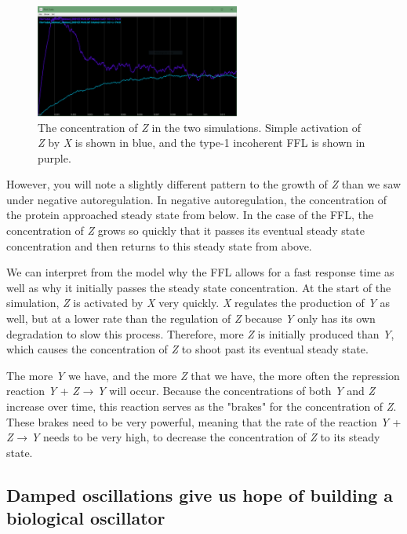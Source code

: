 \begin{figure}[h]
\centering
\mySfFamily
\includegraphics[width = 0.6\textwidth]{../assets/images/600px/ffl_chart.png}
\caption{The concentration of \textit{Z} in the two simulations. Simple activation of \textit{Z} by \textit{X} is shown in blue, and the type-1 incoherent FFL is shown in purple.}
\label{fig:ffl_chart}
\end{figure}

However, you will note a slightly different pattern to the growth of \textit{Z} than we saw under negative autoregulation. In negative autoregulation, the concentration of the protein approached steady state from below. In the case of the FFL, the concentration of \textit{Z} grows so quickly that it passes its eventual steady state concentration and then returns to this steady state from above.

We can interpret from the model why the FFL allows for a fast response time as well as why it initially passes the steady state concentration. At the start of the simulation, \textit{Z} is activated by \textit{X} very quickly. \textit{X} regulates the production of \textit{Y} as well, but at a lower rate than the regulation of \textit{Z} because \textit{Y} only has its own degradation to slow this process. Therefore, more \textit{Z} is initially produced than \textit{Y}, which causes the concentration of \textit{Z} to shoot past its eventual steady state.

The more \textit{Y} we have, and the more \textit{Z} that we have, the more often the repression reaction \textit{Y} + \textit{Z} → \textit{Y} will occur. Because the concentrations of both \textit{Y} and \textit{Z} increase over time, this reaction serves as the "brakes" for the concentration of \textit{Z}. These brakes need to be very powerful, meaning that the rate of the reaction \textit{Y} + \textit{Z} → \textit{Y} needs to be very high, to decrease the concentration of \textit{Z} to its steady state.

\FloatBarrier
{}
\subsection{Damped oscillations give us hope of building a biological oscillator}

